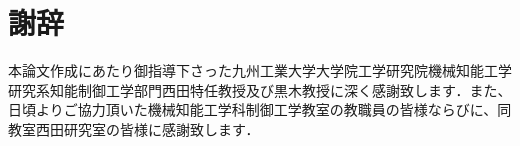 \section*{謝辞}
本論文作成にあたり御指導下さった九州工業大学大学院工学研究院機械知能工学研究系知能制御工学部門西田特任教授及び黒木教授に深く感謝致します．また、日頃よりご協力頂いた機械知能工学科制御工学教室の教職員の皆様ならびに、同教室西田研究室の皆様に感謝致します．
